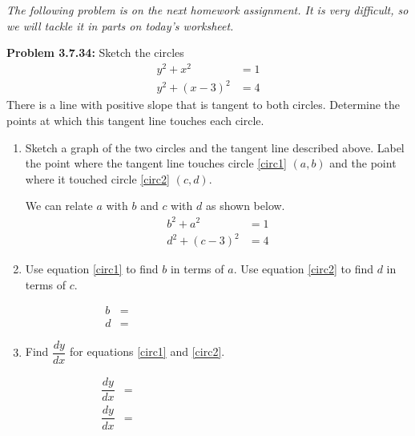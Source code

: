 \documentclass[11pt]{article}
\begin{document}
\drawtitle

\noindent \textit{The following problem is on the next homework assignment.  It
  is very difficult, so we will tackle it in parts on today's
  worksheet.}

\noindent \textbf{Problem 3.7.34:} Sketch the circles
\begin{align*}
  y^2+x^2 &= 1\\
  y^2 + (x-3)^2 & = 4
\end{align*}
There is a line with positive slope that is tangent to both circles.
Determine the points at which this tangent line touches each circle.

\begin{enumerate}
\item Sketch a graph of the two circles and the tangent line described
  above.  Label the point where the tangent line touches circle
  \ref{circ1} $(a,b)$ and the point where it touched circle
  \ref{circ2} $(c,d)$.

  \vfill 

  We can relate $a$ with $b$ and $c$ with $d$ as shown below.
  \begin{align}
    \label{circ1}
    b^2+a^2 &= 1\\
    \label{circ2}
    d^2 + (c-3)^2 & = 4
  \end{align}
  
  \newpage
  
\item Use equation \ref{circ1} to find $b$ in terms of $a$. Use
  equation \ref{circ2} to find $d$ in terms of $c$.
  
  \vfill
  \begin{align}
    \label{ba}
    b &= \hspace{3in}\\ 
    \label{dc}
    d &= \hspace{3in}
  \end{align}
  
\item Find $\dfrac{dy}{dx}$ for equations \ref{circ1} and \ref{circ2}.

  \vfill
  
  \begin{align}
    \label{slope1}
    \dfrac{dy}{dx} &= \hspace{3in}\\ 
    \label{slope2}
    \dfrac{dy}{dx} &= \hspace{3in}
  \end{align}
  

\end{enumerate}
\end{document}
